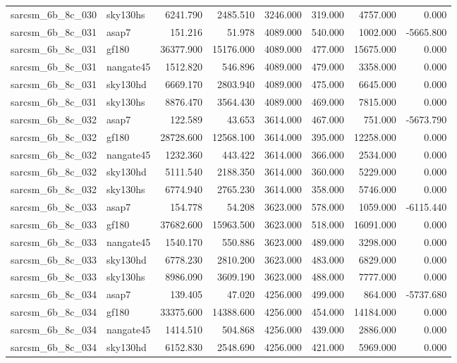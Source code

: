 \begin{tabular}{llrrrrrr}
sarcsm\_6b\_8c\_030 & sky130hs & 6241.790 & 2485.510 & 3246.000 & 319.000 & 4757.000 & 0.000 \\
sarcsm\_6b\_8c\_031 & asap7 & 151.216 & 51.978 & 4089.000 & 540.000 & 1002.000 & -5665.800 \\
sarcsm\_6b\_8c\_031 & gf180 & 36377.900 & 15176.000 & 4089.000 & 477.000 & 15675.000 & 0.000 \\
sarcsm\_6b\_8c\_031 & nangate45 & 1512.820 & 546.896 & 4089.000 & 479.000 & 3358.000 & 0.000 \\
sarcsm\_6b\_8c\_031 & sky130hd & 6669.170 & 2803.940 & 4089.000 & 475.000 & 6645.000 & 0.000 \\
sarcsm\_6b\_8c\_031 & sky130hs & 8876.470 & 3564.430 & 4089.000 & 469.000 & 7815.000 & 0.000 \\
sarcsm\_6b\_8c\_032 & asap7 & 122.589 & 43.653 & 3614.000 & 467.000 & 751.000 & -5673.790 \\
sarcsm\_6b\_8c\_032 & gf180 & 28728.600 & 12568.100 & 3614.000 & 395.000 & 12258.000 & 0.000 \\
sarcsm\_6b\_8c\_032 & nangate45 & 1232.360 & 443.422 & 3614.000 & 366.000 & 2534.000 & 0.000 \\
sarcsm\_6b\_8c\_032 & sky130hd & 5111.540 & 2188.350 & 3614.000 & 360.000 & 5229.000 & 0.000 \\
sarcsm\_6b\_8c\_032 & sky130hs & 6774.940 & 2765.230 & 3614.000 & 358.000 & 5746.000 & 0.000 \\
sarcsm\_6b\_8c\_033 & asap7 & 154.778 & 54.208 & 3623.000 & 578.000 & 1059.000 & -6115.440 \\
sarcsm\_6b\_8c\_033 & gf180 & 37682.600 & 15963.500 & 3623.000 & 518.000 & 16091.000 & 0.000 \\
sarcsm\_6b\_8c\_033 & nangate45 & 1540.170 & 550.886 & 3623.000 & 489.000 & 3298.000 & 0.000 \\
sarcsm\_6b\_8c\_033 & sky130hd & 6778.230 & 2810.200 & 3623.000 & 483.000 & 6829.000 & 0.000 \\
sarcsm\_6b\_8c\_033 & sky130hs & 8986.090 & 3609.190 & 3623.000 & 488.000 & 7777.000 & 0.000 \\
sarcsm\_6b\_8c\_034 & asap7 & 139.405 & 47.020 & 4256.000 & 499.000 & 864.000 & -5737.680 \\
sarcsm\_6b\_8c\_034 & gf180 & 33375.600 & 14388.600 & 4256.000 & 454.000 & 14184.000 & 0.000 \\
sarcsm\_6b\_8c\_034 & nangate45 & 1414.510 & 504.868 & 4256.000 & 439.000 & 2886.000 & 0.000 \\
sarcsm\_6b\_8c\_034 & sky130hd & 6152.830 & 2548.690 & 4256.000 & 421.000 & 5969.000 & 0.000 \\

\end{tabular}
